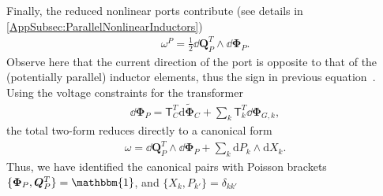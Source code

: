 \documentclass[prx,aps,twocolumn,article]{revtex4-2}
\newcommand{\msf}[1]{\mathsf{#1}}
\newcommand{\bsb}[1]{\boldsymbol{#1}}
\newcommand{\bPhi}{\bsb{\Phi}}
\newcommand{\bQ}{\bsb{Q}}
\newcommand{\dbQ}{\dd\bQ}
\newcommand{\dbPhi}{\dd\bPhi}
\newcommand{\msT}{\msf{T}}
\newcommand{\msId}{\mathbbm{1}}
\begin{document}
Finally, the reduced nonlinear ports contribute (see details in 
\cref{AppSubsec:ParallelNonlinearInductors})
\begin{align}
    \omega^P = \frac{1}{2} \dbQ_P^T \wedge \dbPhi_P.
\end{align}
Observe here that the current direction of the port is opposite to that of the (potentially parallel) inductor elements, thus the sign in previous equation~\cite{ParraRodriguez:2024}. Using the voltage constraints for the transformer
\begin{align}
    \dbPhi_P
    =
    \msT_C^T
    \mathrm{d}\tilde{\bPhi}_C
    +
    \sum_k
    \msT_k^T
    \dbPhi_{G,k},
\end{align}
the total two-form reduces directly to a canonical form
\begin{align}
    \omega
    =
    \dbQ_P^T
    \wedge
    \dbPhi_P
    +
    \sum_k
    \mathrm{d}P_k
    \wedge
    \mathrm{d}X_k.
\end{align}
Thus, we have identified the canonical pairs with Poisson brackets $\{\bPhi_P,\bQ_P^T\}=\msId$, and $\{X_k, P_{k'}\}=\delta_{kk'}$
\end{document}

